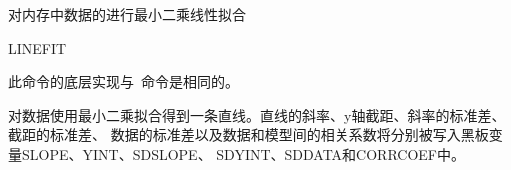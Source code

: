 \label{cmd:linefit}

对内存中数据的进行最小二乘线性拟合

\begin{SACSTX}
LINEFIT
\end{SACSTX}

此命令的底层实现与~命令是相同的。

对数据使用最小二乘拟合得到一条直线。直线的斜率、y轴截距、斜率的标准差、截距的标准差、
数据的标准差以及数据和模型间的相关系数将分别被写入黑板变量SLOPE、YINT、SDSLOPE、
SDYINT、SDDATA和CORRCOEF中。
